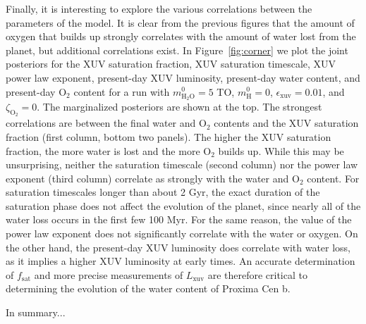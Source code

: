 \documentclass[]{emulateapj}
\newcommand{\note}[1]{{\color{red} #1}}
\begin{document}
Finally, it is interesting to explore the various correlations between the parameters of the model. It is
clear from the previous figures that the amount of oxygen that builds up strongly correlates with the
amount of water lost from the planet, but additional correlations exist. In Figure~\ref{fig:corner} we plot
the joint posteriors for the XUV saturation fraction, XUV saturation timescale, XUV power law exponent,
present-day XUV luminosity, present-day water content, and present-day O$_2$ content for a run with
$m_\mathrm{H_2O}^0 = 5$ TO, $m_\mathrm{H}^0 = 0$, $\epsilon_\mathrm{xuv} = 0.01$, and $\zeta_\mathrm{O_2} = 0$.
The marginalized posteriors are shown at the top. The strongest correlations are between the final
water and O$_2$ contents and the XUV saturation fraction (first column, bottom two panels). The higher
the XUV saturation fraction, the more water is lost and the more O$_2$ builds up. While this
may be unsurprising, neither the saturation timescale (second column) nor the power law exponent 
(third column) correlate as strongly
with the water and O$_2$ content. For saturation timescales longer than about 2 Gyr, the exact duration
of the saturation phase does not affect the evolution of the planet, since nearly all of the water loss
occurs in the first few 100 Myr. For the same reason, the value of the power law exponent does not
significantly correlate with the water or oxygen. On the other hand, the present-day XUV luminosity does correlate
with water loss, as it implies a higher XUV luminosity at early times.
An accurate determination of $f_\mathrm{sat}$ and more precise measurements of $L_\mathrm{xuv}$ are therefore
critical to determining the evolution of the water content of Proxima Cen b.

\note{In summary...}

\clearpage


\end{document}
